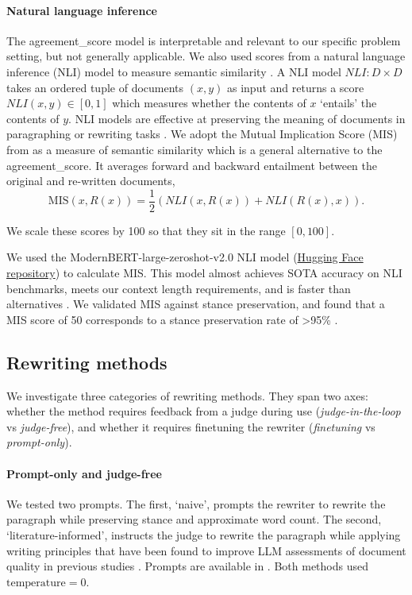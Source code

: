 \documentclass{article}
\begin{document}
\paragraph{Natural language inference} The agreement\_score model is interpretable and relevant to our specific problem setting, but not generally applicable. We also used scores from a natural language inference (NLI) model to measure semantic similarity \citep{bowmanLargeAnnotatedCorpus2015}. A NLI model $NLI : D \times D$ takes an ordered tuple of documents $(x, y)$ as input and returns a score $NLI(x,y) \in [0,1]$ which measures whether the contents of $x$ `entails' the contents of $y$. NLI models are effective at preserving the meaning of documents in paragraphing or rewriting tasks \citep{babakovLargescaleComputationalStudy2022}. We adopt the Mutual Implication Score (MIS) from \citep{babakovLargescaleComputationalStudy2022} as a measure of semantic similarity which is a general alternative to the agreement\_score. It averages forward and backward entailment between the original and re-written documents,
\begin{equation}
  \text{MIS}(x,R(x)) = \frac{1}{2} (NLI(x,R(x)) + NLI(R(x),x)).
\end{equation}

We scale these scores by 100 so that they sit in the range $[0,100]$.

We used the ModernBERT-large-zeroshot-v2.0 NLI model (\href{https://huggingface.co/MoritzLaurer/ModernBERT-large-zeroshot-v2.0}{Hugging Face repository}) to calculate MIS. This model almost achieves SOTA accuracy on NLI benchmarks, meets our context length requirements, and is faster than alternatives \citep{laurerBuildingEfficientUniversal2024}. We validated MIS against stance preservation, and found that a MIS score of 50 corresponds to a stance preservation rate of >95\% .

\subsection{Rewriting methods}

We investigate three categories of rewriting methods. They span two axes: whether the method requires feedback from a judge during use (\emph{judge-in-the-loop} vs \emph{judge-free}), and whether it requires finetuning the rewriter (\emph{finetuning} vs \emph{prompt-only}). 

\paragraph{Prompt-only and judge-free} We tested two prompts. The first, `naive', prompts the rewriter to rewrite the paragraph while preserving stance and approximate word count. The second, `literature-informed', instructs the judge to rewrite the paragraph while applying writing principles that have been found to improve LLM assessments of document quality in previous studies \citep{aggarwalGEOGenerativeEngine2024a, liuGEvalNLGEvaluation2023, kimPrometheusInducingFineGrained2023}. Prompts are available in . Both methods used $\text{temperature} = 0$.
\end{document}
